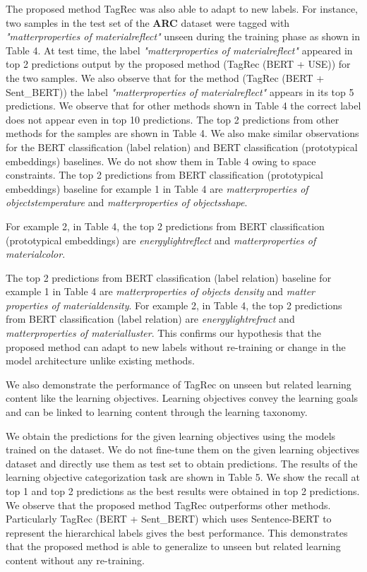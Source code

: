 \documentclass[runningheads, envcountsame, a4paper]{llncs}
\begin{document}
        
\setlength{\parindent}{4ex}The proposed method TagRec was also able to adapt to new labels. For instance, two samples in the test set of the \textbf{ARC} dataset were tagged with \textit{"matterproperties of materialreflect"} unseen during the training phase as shown in Table 4. At test time, the label \textit{"matterproperties of materialreflect"} appeared in top 2 predictions output by the proposed method (TagRec (BERT + USE)) for the two samples. We also observe that for the method (TagRec (BERT + Sent\_BERT)) the label \textit{"matterproperties of materialreflect"} appears in its top 5 predictions. We observe that for other methods shown in Table 4 the correct label does not appear even in top 10 predictions. The top 2 predictions from other methods for the samples are shown in Table 4. We also make similar observations for the BERT classification (label relation) and BERT classification (prototypical embeddings) baselines. We do not show them in Table 4 owing to space constraints. The top 2 predictions from BERT classification (prototypical embeddings) baseline for example 1 in Table 4 are \textit{matterproperties of objectstemperature} and \textit{matterproperties of objectsshape}.

For example 2, in Table 4, the top 2 predictions from BERT classification (prototypical embeddings) are \textit{energylightreflect} and \textit{matterproperties of materialcolor}.

The top 2 predictions from BERT classification (label relation) baseline for example 1 in Table 4 are \textit{matterproperties of objects density} and \textit{matter\\properties of materialdensity}. For example 2, in Table 4, the top 2 predictions from BERT classification (label relation) are \textit{energylightrefract} and \textit{matterproperties of materialluster}. This confirms our hypothesis that the proposed method can adapt to new labels without re-training or change in the model architecture unlike existing methods. 


We also demonstrate the performance of TagRec on unseen but related learning content like the learning objectives. Learning objectives convey the learning goals and can be linked to learning content through the learning taxonomy.


We obtain the predictions for the given learning objectives using the models trained on the  dataset. We do not fine-tune them on the given learning objectives dataset and directly use them as test set to obtain predictions. The results of the learning objective categorization task are shown in Table 5. We show the recall at top 1 and top 2 predictions as the best results were obtained in top 2 predictions. We observe that the proposed method TagRec outperforms other methods. Particularly TagRec (BERT + Sent\_BERT) which uses Sentence-BERT to represent the hierarchical labels gives the best performance. This demonstrates that the proposed method is able to generalize to unseen but related learning content without any re-training.
\end{document}
